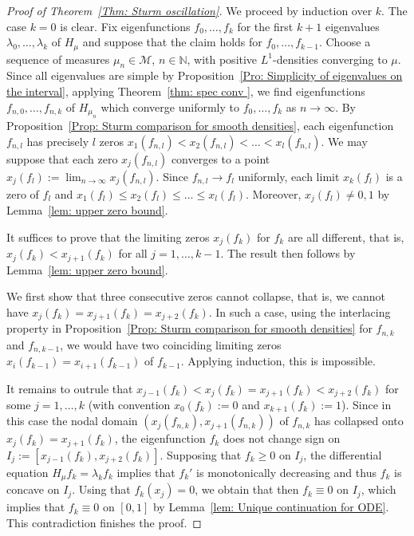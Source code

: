 \documentclass[reqno]{amsart}
\theoremstyle{plain}
\theoremstyle{definition}
\theoremstyle{remark}
\numberwithin{equation}{section}
\newcommand{\N}{\mathbb{N}}     %
\newcommand{\cM}{\mathcal{M}}
\begin{document}
\begin{proof}[Proof of Theorem~\ref{Thm: Sturm oscillation}] We proceed by induction over $k$. The case $k=0$ is clear. Fix eigenfunctions $f_0, \dots, f_k$ for the first $k+1$ eigenvalues $\lambda_0, \dots, \lambda_k$ of $H_\mu$ and suppose that the claim holds for $f_0, \dots, f_{k-1}$.  Choose a sequence of measures $\mu_n \in \cM$, $n \in \N$, with positive $L^1$-densities converging to $\mu$. Since all eigenvalues are simple by Proposition~\ref{Pro: Simplicity of eigenvalues on the interval}, applying Theorem~\ref{thm: spec conv }, we find eigenfunctions $f_{n,0}, \dots, f_{n,k}$ of $H_{\mu_n}$ which converge uniformly to $f_0, \dots, f_k$ as $n \to \infty$. By Proposition~\ref{Prop: Sturm comparison for smooth densities}, each eigenfunction $f_{n,l}$ has precisely $l$ zeros $x_1(f_{n,l}) < x_2(f_{n,l}) < \dots < x_l(f_{n,l})$. We may suppose that each zero $x_j(f_{n,l})$ converges to a point $ x_j(f_l) := \lim_{n \to \infty} x_j(f_{n,l})$. Since $f_{n, l} \to f_l$ uniformly, each limit $x_k(f_l)$ is a zero of $f_l$ and $x_1(f_l) \le x_2(f_l) \le \dots \le x_l(f_l)$. Moreover, $x_j(f_l) \neq 0, 1$ by Lemma~\ref{lem: upper zero bound}.
	
	It suffices to prove that the limiting zeros $x_j(f_k)$ for $f_k$ are all different, that is, $x_j(f_k) < x_{j+1}(f_k)$ for all $j=1, \dots, k-1$. The result then follows by Lemma~\ref{lem: upper zero bound}.
	
	We first show that three consecutive zeros cannot collapse, that is, we cannot have $x_j(f_k) = x_{j+1}(f_k) =  x_{j+2}(f_k)$. In such a case, using the interlacing property in Proposition~\ref{Prop: Sturm comparison for smooth densities} for $f_{n,k}$ and $f_{n, k-1}$, we would have two coinciding limiting zeros $x_i(f_{k-1}) = x_{i+1}(f_{k-1})$ of $f_{k-1}$. Applying induction, this is impossible.
	
	It remains to outrule that $x_{j-1}(f_k)< x_j(f_k) = x_{j+1}(f_k) < x_{j+2}(f_k)$ for some $j=1, \dots, k$ (with convention $x_0(f_k) := 0$ and $x_{k+1}(f_k) :=1$). Since in this case the nodal domain $(x_j(f_{n,k}), x_{j+1}(f_{n,k}))$ of $f_{n,k}$ has collapsed onto $x_j(f_k) = x_{j+1}(f_k)$, the eigenfunction $f_k$ does not change sign on $I_j := [x_{j-1}(f_k), x_{j+2}(f_k)]$. Supposing that $f_k \ge 0$ on $I_j$, the differential equation $H_\mu f_k = \lambda_k f_k$ implies that $f_k'$ is monotonically decreasing and thus $f_k$ is concave on $I_j$. Using that $f_k(x_j) = 0$, we obtain that then $f_k \equiv 0$ on $I_j$, which implies that $f_k \equiv 0$ on $[0,1]$ by Lemma~\ref{lem: Unique continuation for ODE}. This contradiction finishes the proof.
\end{proof}
\end{document}
